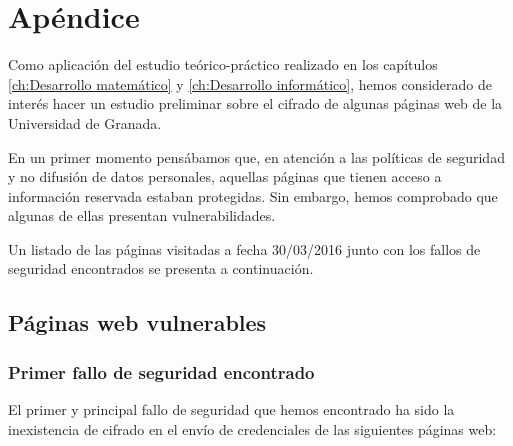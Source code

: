 \chapter{Apéndice}
\label{ap:apendice}


\begin{center}
\end{center}

Como aplicación del estudio teórico-práctico realizado en los capítulos \ref{ch:Desarrollo matemático} y \ref{ch:Desarrollo informático}, hemos considerado de interés hacer un estudio preliminar sobre el cifrado de algunas páginas web de la Universidad de Granada.

En un primer momento pensábamos que, en atención a las políticas de seguridad y no difusión de datos personales, aquellas páginas que tienen acceso a información reservada estaban protegidas. Sin embargo, hemos comprobado que algunas de ellas presentan vulnerabilidades.

Un listado de las páginas visitadas a fecha 30/03/2016 junto con los fallos de seguridad encontrados se presenta a continuación.

\section*{Páginas web vulnerables}

\subsection*{Primer fallo de seguridad encontrado}

El primer y principal fallo de seguridad que hemos encontrado ha sido la inexistencia de cifrado en el envío de credenciales de las siguientes páginas web:

